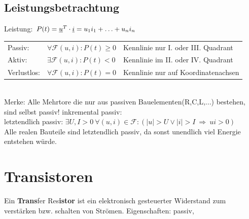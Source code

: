 \documentclass[fs, footer]{latex4ei}
\begin{document}
\begin{multicols*}{4}
	\subsection{Leistungsbetrachtung}
	Leistung: $P(t)=\underline{u}^T \cdot \underline{i}=u_1 i_1 + \dotsc + u_n i_n$ \\
	\begin{tabular*}{\columnwidth}{@{\extracolsep\fill}lll@{}}
		Passiv: & $\forall \mathcal F(u,i): P(t)\ge 0$ & Kennlinie nur I. oder III. Quadrant\\
		Aktiv: & $\exists \mathcal F(u,i): P(t)<0$ & Kennlinie im II. oder IV. Quadrant\\
		Verlustlos: & $\forall \mathcal F(u,i): P(t)=0$ & Kennlinie nur auf Koordinatenachsen\\
	\end{tabular*}\\
	Merke: Alle Mehrtore die nur aus passiven Bauelementen(R,C,L,...) bestehen, sind selbst passiv!
	inkremental passiv:\\
	letztendlich passiv: $\exists U,I>0 \ \forall (u,i) \in \mathcal F : (|u| > U \lor |i| > I \ \Rightarrow \ ui > 0)$\\
	Alle realen Bauteile sind letztendlich passiv, da sonst unendlich viel Energie entstehen würde.\\
	
	



\section{Transistoren}
Ein \textbf{Trans}fer Res\textbf{istor} ist ein elektronisch gesteuerter Widerstand zum verstärken bzw. schalten von Strömen.
Eigenschaften: passiv,

\end{multicols*}
\end{document}
